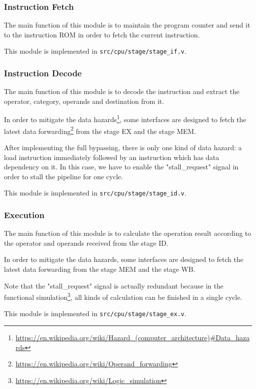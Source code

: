 \documentclass{article}
\begin{document}
\subsubsection{Instruction Fetch}
The main function of this module is to maintain the program counter and send it to the instruction ROM in order to fetch the current instruction.


This module is implemented in \texttt{src/cpu/stage/stage\_if.v}.

\subsubsection{Instruction Decode}
The main function of this module is to decode the instruction and extract the operator, category, operands and destination from it.


In order to mitigate the data hazards\footnote{\url{https://en.wikipedia.org/wiki/Hazard\_(computer\_architecture)\#Data\_hazards}}, some interfaces are designed to fetch the latest data forwarding\footnote{\url{https://en.wikipedia.org/wiki/Operand\_forwarding}} from the stage EX and the stage MEM.

After implementing the full bypassing, there is only one kind of data hazard: a load instruction immediately followed by an instruction which has data dependency on it. In this case, we have to enable the "stall\_request" signal in order to stall the pipeline for one cycle.

This module is implemented in \texttt{src/cpu/stage/stage\_id.v}.

\newpage
\subsubsection{Execution}
The main function of this module is to calculate the operation result according to the operator and operands received from the stage ID.


In order to mitigate the data hazards, some interfaces are designed to fetch the latest data forwarding from the stage MEM and the stage WB.

Note that the "stall\_request" signal is actually redundant because in the functional simulation\footnote{\url{https://en.wikipedia.org/wiki/Logic\_simulation}}, all kinds of calculation can be finished in a single cycle.

This module is implemented in \texttt{src/cpu/stage/stage\_ex.v}.
\end{document}

